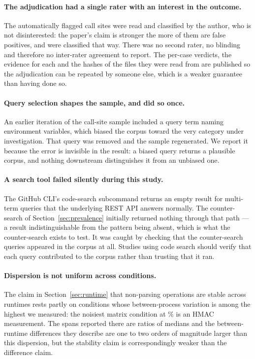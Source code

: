 \documentclass[pdflatex,sn-basic,twocolumn]{sn-jnl}
\begin{document}
\paragraph{The adjudication had a single rater with an interest in the outcome.}
The \AdjudicatedTotal{} automatically flagged call sites were read and classified
by the author, who is not disinterested: the paper's claim is stronger the more
of them are false positives, and \AdjudicatedFalsePositive{} were classified that
way. There was no second rater, no blinding and therefore no inter-rater
agreement to report. The per-case verdicts, the evidence for each and the hashes
of the files they were read from are published so the adjudication can be
repeated by someone else, which is a weaker guarantee than having done so.

\paragraph{Query selection shapes the sample, and did so once.} An earlier
iteration of the call-site sample included a query term naming environment
variables, which biased the corpus toward the very category under investigation.
That query was removed and the sample regenerated. We report it because the error
is invisible in the result: a biased query returns a plausible corpus, and
nothing downstream distinguishes it from an unbiased one.

\paragraph{A search tool failed silently during this study.} The GitHub CLI's
code-search subcommand returns an empty result for multi-term queries that the
underlying REST API answers normally. The counter-search of
Section~\ref{sec:prevalence} initially returned nothing through that path --- a
result indistinguishable from the pattern being absent, which is what the
counter-search exists to test. It was caught by checking that the counter-search
queries appeared in the corpus at all. Studies using code search should verify
that each query contributed to the corpus rather than trusting that it ran.

\paragraph{Dispersion is not uniform across conditions.} The claim in
Section~\ref{sec:runtime} that non-parsing operations are stable across runtimes
rests partly on conditions whose between-process variation is among the highest
we measured: the noisiest matrix condition at \MatrixCvMax\% is an HMAC
measurement. The spans reported there are ratios of medians and the
between-runtime differences they describe are one to two orders of magnitude
larger than this dispersion, but the stability claim is correspondingly weaker
than the difference claim.
\end{document}
